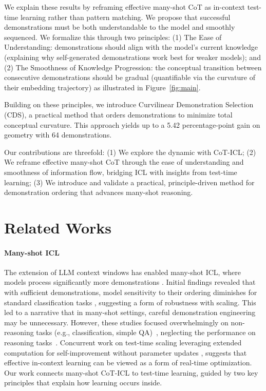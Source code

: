 \documentclass{llmxive}
\begin{document}
We explain these results by reframing effective many-shot CoT as in-context test-time learning rather than pattern matching. We propose that successful demonstrations must be both understandable to the model and smoothly sequenced. We formalize this through two principles: (1) The Ease of Understanding: demonstrations should align with the model's current knowledge (explaining why self-generated demonstrations work best for weaker models); and (2) The Smoothness of Knowledge Progression: the conceptual transition between consecutive demonstrations should be gradual (quantifiable via the curvature of their embedding trajectory) as illustrated in Figure~\ref{fig:main}.

Building on these principles, we introduce Curvilinear Demonstration Selection (CDS), a practical method that orders demonstrations to minimize total conceptual curvature. This approach yields up to a 5.42 percentage-point gain on geometry with 64 demonstrations.

Our contributions are threefold: (1) We explore the dynamic with CoT-ICL; (2) We reframe effective many-shot CoT through the ease of understanding and smoothness of information flow, bridging ICL with insights from test-time learning; (3) We introduce and validate a practical, principle-driven method for demonstration ordering that advances many-shot reasoning.




\section{Related Works}


\paragraph{Many-shot ICL}
The extension of LLM context windows \cite{peng2024yarn, lminfinite} has enabled many-shot ICL, where models process significantly more demonstrations \cite{agarwal2024manyshot, bertsch-etal-2025-context, chung-etal-2024-selection}. Initial findings revealed that with sufficient demonstrations, model sensitivity to their ordering diminishes for standard classification tasks \cite{baek2025revisitingincontextlearninglong, bertsch-etal-2025-context}, suggesting a form of  robustness with scaling. This led to a narrative that in many-shot settings, careful demonstration engineering may be unnecessary. However, these studies focused overwhelmingly on non-reasoning tasks (e.g., classification, simple QA)~\cite{baek2025revisitingincontextlearninglong, bertsch-etal-2025-context}, neglecting the performance on reasoning tasks~\cite{hendrycksmath2021, chung-etal-2025-divlogiceval, xu2025detectiveqaevaluatinglongcontextreasoning, yu2025preludebenchmarkdesignedrequire}. Concurrent work on test-time scaling leveraging extended computation for self-improvement without parameter updates \cite{snell2024scaling, tpo}, suggests that effective in-context learning can be viewed as a form of real-time optimization. Our work connects many-shot CoT-ICL to test-time learning, guided by two key principles that explain how learning occurs inside.
\end{document}
